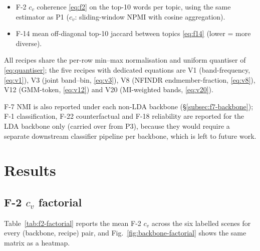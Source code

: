 \documentclass[journal,a4paper,10pt]{IEEEtran}
\begin{document}
\begin{itemize}
  \item F-2 $c_v$ coherence \eqref{eq:f2} on the top-10 words per topic,
    using the same estimator as P1 ($c_v$: sliding-window NPMI with
    cosine aggregation).
  \item F-14 mean off-diagonal top-10 jaccard between topics
    \eqref{eq:f14} (lower = more diverse).
\end{itemize}

All recipes share the per-row min--max normalisation and uniform
quantiser of \eqref{eq:quantiser}; the five recipes with dedicated
equations are V1 (band-frequency, \eqref{eq:v1}), V3 (joint band--bin,
\eqref{eq:v3}), V8 (NFINDR endmember-fraction, \eqref{eq:v8}), V12
(GMM-token, \eqref{eq:v12}) and V20 (MI-weighted bands, \eqref{eq:v20}).

F-7 NMI is also reported under each non-LDA backbone
(\S\ref{subsec:f7-backbone}); F-1 classification, F-22 counterfactual
and F-18 reliability are reported for the LDA backbone only (carried
over from P3), because they would require a separate downstream
classifier pipeline per backbone, which is left to future work.

\section{Results}\label{sec:results}

\subsection{F-2 \texorpdfstring{$c_v$}{cv} factorial}

Table~\ref{tab:f2-factorial} reports the mean F-2 $c_v$ across the six
labelled scenes for every (backbone, recipe) pair, and
Fig.~\ref{fig:backbone-factorial} shows the same matrix as a heatmap.
\end{document}

